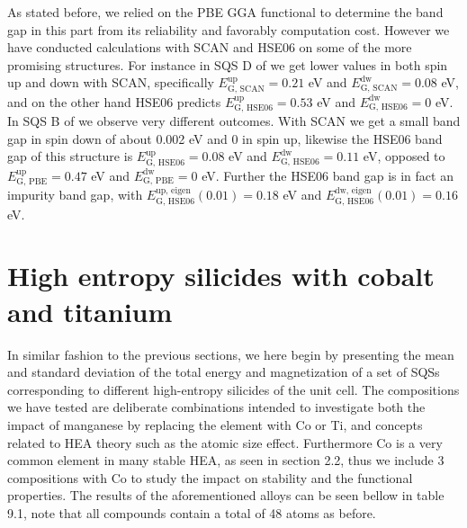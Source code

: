 As stated before, we relied on the PBE GGA functional to determine the band gap in this part from its reliability and favorably computation cost. However we have conducted calculations with SCAN and HSE06 on some of the more promising structures. For instance in SQS D of  we get lower values in both spin up and down with SCAN, specifically $E_\text{G, SCAN} ^\text{up}= 0.21$ eV and $E_\text{G, SCAN} ^\text{dw} = 0.08$ eV, and on the other hand HSE06 predicts $E_\text{G, HSE06} ^\text{up} = 0.53$ eV and $E_\text{G, HSE06} ^\text{dw} = 0$ eV. In SQS B of  we observe very different outcomes. With SCAN we get a small band gap in spin down of about 0.002 eV and 0 in spin up, likewise the HSE06 band gap of this structure is $E_\text{G, HSE06} ^\text{up} = 0.08$ eV and $E_\text{G, HSE06} ^\text{dw} = 0.11$ eV, opposed to $E_\text{G, PBE} ^\text{up} = 0.47$ eV and $E_\text{G, PBE} ^\text{dw} = 0$ eV. Further the HSE06 band gap is in fact an impurity band gap, with $E_\text{G, HSE06} ^\text{up, eigen}(0.01) = 0.18$ eV and $E_\text{G, HSE06} ^\text{dw, eigen}(0.01) = 0.16$ eV.


\section{High entropy silicides with cobalt and titanium}

In similar fashion to the previous sections, we here begin by presenting the mean and standard deviation of the total energy and magnetization of a set of SQSs corresponding to different high-entropy silicides of the  unit cell. The compositions we have tested are deliberate combinations intended to investigate both the impact of manganese by replacing the element with Co or Ti, and concepts related to HEA theory such as the atomic size effect. Furthermore Co is a very common element in many stable HEA, as seen in section 2.2, thus we include 3 compositions with Co to study the impact on stability and the functional properties. The results of the aforementioned alloys can be seen bellow in table 9.1, note that all compounds contain a total of 48 atoms as before.  

